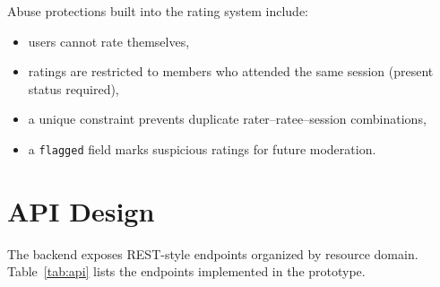 \documentclass[conference]{IEEEtran}
\begin{document}
Abuse protections built into the rating system include:
\begin{itemize}
    \item users cannot rate themselves,
    \item ratings are restricted to members who attended the same session (present status required),
    \item a unique constraint prevents duplicate rater--ratee--session combinations,
    \item a \texttt{flagged} field marks suspicious ratings for future moderation.
\end{itemize}

\section{API Design}
The backend exposes REST-style endpoints organized by resource domain. Table~\ref{tab:api} lists the endpoints implemented in the prototype.
\end{document}
